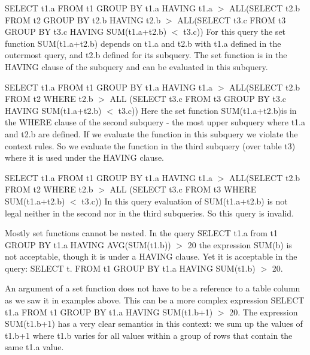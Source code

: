 \begin{DoxyEnumerate}
\item S\+E\+L\+E\+CT t1.\+a F\+R\+OM t1 G\+R\+O\+UP BY t1.\+a H\+A\+V\+I\+NG t1.\+a $>$ A\+LL(S\+E\+L\+E\+CT t2.\+b F\+R\+OM t2 G\+R\+O\+UP BY t2.\+b H\+A\+V\+I\+NG t2.\+b $>$ A\+LL(S\+E\+L\+E\+CT t3.\+c F\+R\+OM t3 G\+R\+O\+UP BY t3.\+c H\+A\+V\+I\+NG S\+UM(t1.\+a+t2.\+b) $<$ t3.\+c)) For this query the set function S\+UM(t1.\+a+t2.\+b) depends on t1.\+a and t2.\+b with t1.\+a defined in the outermost query, and t2.\+b defined for its subquery. The set function is in the H\+A\+V\+I\+NG clause of the subquery and can be evaluated in this subquery.
\item S\+E\+L\+E\+CT t1.\+a F\+R\+OM t1 G\+R\+O\+UP BY t1.\+a H\+A\+V\+I\+NG t1.\+a $>$ A\+LL(S\+E\+L\+E\+CT t2.\+b F\+R\+OM t2 W\+H\+E\+RE t2.\+b $>$ A\+LL (S\+E\+L\+E\+CT t3.\+c F\+R\+OM t3 G\+R\+O\+UP BY t3.\+c H\+A\+V\+I\+NG S\+UM(t1.\+a+t2.\+b) $<$ t3.\+c)) Here the set function S\+UM(t1.\+a+t2.\+b)is in the W\+H\+E\+RE clause of the second subquery -\/ the most upper subquery where t1.\+a and t2.\+b are defined. If we evaluate the function in this subquery we violate the context rules. So we evaluate the function in the third subquery (over table t3) where it is used under the H\+A\+V\+I\+NG clause.
\item S\+E\+L\+E\+CT t1.\+a F\+R\+OM t1 G\+R\+O\+UP BY t1.\+a H\+A\+V\+I\+NG t1.\+a $>$ A\+LL(S\+E\+L\+E\+CT t2.\+b F\+R\+OM t2 W\+H\+E\+RE t2.\+b $>$ A\+LL (S\+E\+L\+E\+CT t3.\+c F\+R\+OM t3 W\+H\+E\+RE S\+UM(t1.\+a+t2.\+b) $<$ t3.\+c)) In this query evaluation of S\+UM(t1.\+a+t2.\+b) is not legal neither in the second nor in the third subqueries. So this query is invalid.
\end{DoxyEnumerate}

Mostly set functions cannot be nested. In the query S\+E\+L\+E\+CT t1.\+a from t1 G\+R\+O\+UP BY t1.\+a H\+A\+V\+I\+NG A\+VG(S\+UM(t1.\+b)) $>$ 20 the expression S\+U\+M(b) is not acceptable, though it is under a H\+A\+V\+I\+NG clause. Yet it is acceptable in the query\+: S\+E\+L\+E\+CT t. F\+R\+OM t1 G\+R\+O\+UP BY t1.\+a H\+A\+V\+I\+NG S\+UM(t1.\+b) $>$ 20.

An argument of a set function does not have to be a reference to a table column as we saw it in examples above. This can be a more complex expression S\+E\+L\+E\+CT t1.\+a F\+R\+OM t1 G\+R\+O\+UP BY t1.\+a H\+A\+V\+I\+NG S\+UM(t1.\+b+1) $>$ 20. The expression S\+UM(t1.\+b+1) has a very clear semantics in this context\+: we sum up the values of t1.\+b+1 where t1.\+b varies for all values within a group of rows that contain the same t1.\+a value.

